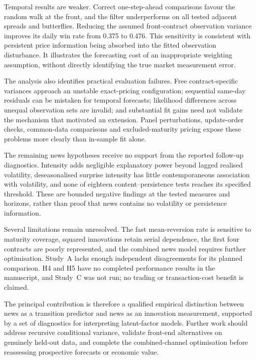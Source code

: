 \documentclass[journal]{IEEEtran}
\begin{document}
Temporal results are weaker. Correct one-step-ahead comparisons favour the random walk at the front, and the filter underperforms on all tested adjacent spreads and butterflies. Reducing the assumed front-contract observation variance improves its daily win rate from 0.375 to 0.476. This sensitivity is consistent with persistent price information being absorbed into the fitted observation disturbance. It illustrates the forecasting cost of an inappropriate weighting assumption, without directly identifying the true market measurement error.

The analysis also identifies practical evaluation failures. Free contract-specific variances approach an unstable exact-pricing configuration; sequential same-day residuals can be mistaken for temporal forecasts; likelihood differences across unequal observation sets are invalid; and substantial fit gains need not validate the mechanism that motivated an extension. Panel perturbations, update-order checks, common-data comparisons and excluded-maturity pricing expose these problems more clearly than in-sample fit alone.

The remaining news hypotheses receive no support from the reported follow-up diagnostics. Intensity adds negligible explanatory power beyond lagged realised volatility, deseasonalised surprise intensity has little contemporaneous association with volatility, and none of eighteen content--persistence tests reaches its specified threshold. These are bounded negative findings at the tested measures and horizons, rather than proof that news contains no volatility or persistence information.

Several limitations remain unresolved. The fast mean-reversion rate is sensitive to maturity coverage, squared innovations retain serial dependence, the first four contracts are poorly represented, and the combined news model requires further optimisation. Study~A lacks enough independent disagreements for its planned comparison. H4 and H5 have no completed performance results in the manuscript, and Study~C was not run; no trading or transaction-cost benefit is claimed.

The principal contribution is therefore a qualified empirical distinction between news as a transition predictor and news as an innovation measurement, supported by a set of diagnostics for interpreting latent-factor models. Further work should address recursive conditional variance, validate front-end alternatives on genuinely held-out data, and complete the combined-channel optimisation before reassessing prospective forecasts or economic value.
\end{document}
